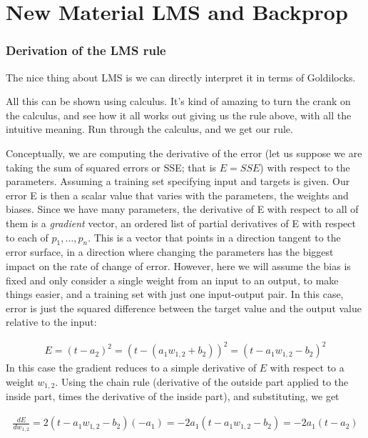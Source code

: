 \chapter{New Material LMS and Backprop}

\subsection{Derivation of the LMS rule}

The nice thing about LMS is we can directly interpret it in terms of Goldilocks.

All this can be shown using calculus. It's kind of amazing to turn the crank on the calculus, and see how it all works out giving us the rule above, with all the intuitive meaning. Run through the calculus, and we get our rule. 

Conceptually, we are computing the derivative of the error (let us suppose we are taking the sum of squared errors or SSE; that is $E = SSE$) with respect to the parameters. Assuming a training set specifying input and targets is given. Our error E is then a scalar value that varies with the parameters, the weights and biases. Since we have many parameters, the derivative of E with respect to all of them is a \emph{gradient} vector, an ordered list of partial derivatives of E with respect to each of $p_1,\dots, p_n$.  This is a vector that points in a direction tangent to the error surface, in a direction where changing the parameters has the biggest impact on the rate of change of error.  However, here we will assume the bias is fixed and only consider a single weight from an input to an output, to make things easier, and a training set with just one input-output pair.  In this case, error is just the squared difference between the target value and the output value relative to the input:

\begin{eqnarray*}
E = (t - a_2)^2  =  (t - ( a_1 w_{1,2} + b_2))^2  =  (t -  a_1 w_{1,2} -  b_2)^2 
\end{eqnarray*}
In this case the gradient reduces to a simple derivative of $E$ with respect to a weight $w_{1,2}$.  Using the chain rule (derivative of the outside part applied to the inside part, times the derivative of the inside part), and substituting, we get

\begin{eqnarray*}
\frac{dE}{dw_{1,2}} = 2 (t - a_1 w_{1,2} - b_2) (-a_1) =  -2 a_1 (t - a_1 w_{1,2} - b_2) =  -2 a_1 (t - a_2)
\end{eqnarray*}

